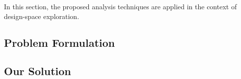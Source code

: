 In this section, the proposed analysis techniques are applied in the context of design-space exploration.

\subsection{Problem Formulation}


\subsection{Our Solution}

